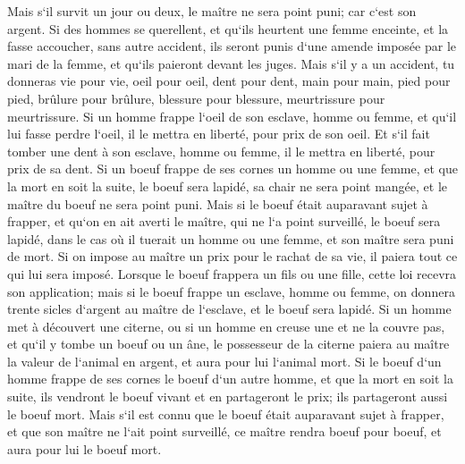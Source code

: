 \verse Mais s`il survit un jour ou deux, le maître ne sera point puni; car c`est son argent. 
\verse Si des hommes se querellent, et qu`ils heurtent une femme enceinte, et la fasse accoucher, sans autre accident, ils seront punis d`une amende imposée par le mari de la femme, et qu`ils paieront devant les juges. 
\verse Mais s`il y a un accident, tu donneras vie pour vie, 
\verse oeil pour oeil, dent pour dent, main pour main, pied pour pied, 
\verse brûlure pour brûlure, blessure pour blessure, meurtrissure pour meurtrissure. 
\verse Si un homme frappe l`oeil de son esclave, homme ou femme, et qu`il lui fasse perdre l`oeil, il le mettra en liberté, pour prix de son oeil. 
\verse Et s`il fait tomber une dent à son esclave, homme ou femme, il le mettra en liberté, pour prix de sa dent. 
\verse Si un boeuf frappe de ses cornes un homme ou une femme, et que la mort en soit la suite, le boeuf sera lapidé, sa chair ne sera point mangée, et le maître du boeuf ne sera point puni. 
\verse Mais si le boeuf était auparavant sujet à frapper, et qu`on en ait averti le maître, qui ne l`a point surveillé, le boeuf sera lapidé, dans le cas où il tuerait un homme ou une femme, et son maître sera puni de mort. 
\verse Si on impose au maître un prix pour le rachat de sa vie, il paiera tout ce qui lui sera imposé. 
\verse Lorsque le boeuf frappera un fils ou une fille, cette loi recevra son application; 
\verse mais si le boeuf frappe un esclave, homme ou femme, on donnera trente sicles d`argent au maître de l`esclave, et le boeuf sera lapidé. 
\verse Si un homme met à découvert une citerne, ou si un homme en creuse une et ne la couvre pas, et qu`il y tombe un boeuf ou un âne, 
\verse le possesseur de la citerne paiera au maître la valeur de l`animal en argent, et aura pour lui l`animal mort. 
\verse Si le boeuf d`un homme frappe de ses cornes le boeuf d`un autre homme, et que la mort en soit la suite, ils vendront le boeuf vivant et en partageront le prix; ils partageront aussi le boeuf mort. 
\verse Mais s`il est connu que le boeuf était auparavant sujet à frapper, et que son maître ne l`ait point surveillé, ce maître rendra boeuf pour boeuf, et aura pour lui le boeuf mort. 

\chapter{}

